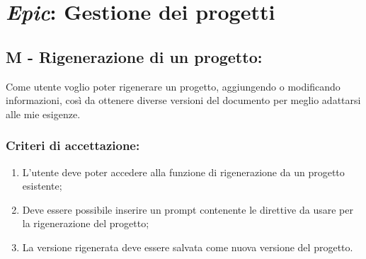 \vspace{0.5cm}

\section*{\textit{Epic}: Gestione dei progetti}

\subsection*{M - Rigenerazione di un progetto:}

\noindent Come utente voglio poter rigenerare un progetto, aggiungendo o modificando informazioni, così da ottenere diverse versioni del documento per meglio adattarsi alle mie esigenze.

\subsubsection*{Criteri di accettazione:}

\begin{enumerate}
    \item L'utente deve poter accedere alla funzione di rigenerazione da un progetto esistente;
    \item Deve essere possibile inserire un \gls{prompt} contenente le direttive da usare per la rigenerazione del progetto;
    \item La versione rigenerata deve essere salvata come nuova versione del progetto.
\end{enumerate}

\vspace{0.5cm}


